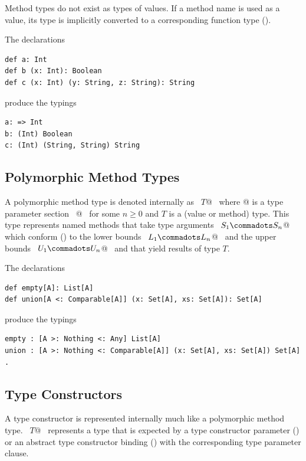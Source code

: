 Method types do not exist as types of values. If a method name is used
as a value, its type is implicitly converted to a corresponding
function type ().

\example The declarations
\begin{lstlisting}
def a: Int
def b (x: Int): Boolean
def c (x: Int) (y: String, z: String): String
\end{lstlisting}
produce the typings
\begin{lstlisting}
a: => Int
b: (Int) Boolean
c: (Int) (String, String) String
\end{lstlisting}

\subsection{Polymorphic Method Types}
\label{sec:poly-types}

A polymorphic method type is denoted internally as ~\lstinline@[$\tps\,$]$T$@~ where
\lstinline@[$\tps\,$]@ is a type parameter section 
~\lstinline@[$a_1$ >: $L_1$ <: $U_1 \commadots a_n$ >: $L_n$ <: $U_n$]@~ 
for some $n \geq 0$ and $T$ is a
(value or method) type.  This type represents named methods that
take type arguments ~\lstinline@$S_1 \commadots S_n$@~ which
conform () to the lower bounds
~\lstinline@$L_1 \commadots L_n$@~ and the upper bounds
~\lstinline@$U_1 \commadots U_n$@~ and that yield results of type $T$.

\example The declarations
\begin{lstlisting}
def empty[A]: List[A]
def union[A <: Comparable[A]] (x: Set[A], xs: Set[A]): Set[A]
\end{lstlisting}
produce the typings
\begin{lstlisting}
empty : [A >: Nothing <: Any] List[A]
union : [A >: Nothing <: Comparable[A]] (x: Set[A], xs: Set[A]) Set[A]  .
\end{lstlisting}

\subsection{Type Constructors} %
\label{sec:higherkinded-types}
A type constructor is represented internally much like a polymorphic method type.
~\lstinline@[$\pm$ $a_1$ >: $L_1$ <: $U_1 \commadots \pm a_n$ >: $L_n$ <: $U_n$] $T$@~ represents a type that is expected by a type constructor parameter () or an abstract type constructor binding () with the corresponding type parameter clause.

